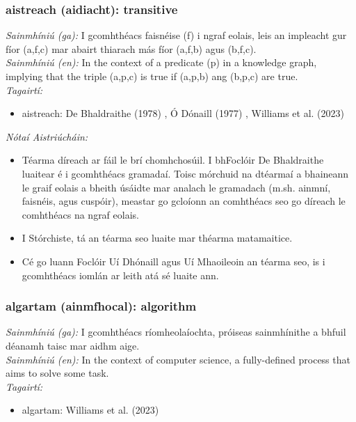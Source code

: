 \subsubsection*{aistreach (aidiacht): transitive}
 \noindent \textit{Sainmhíniú (ga):} I gcomhthéacs faisnéise (f) i ngraf eolais, leis an impleacht gur fíor (a,f,c) mar abairt thiarach más fíor (a,f,b) agus (b,f,c).
\\
 \noindent \textit{Sainmhíniú (en):} In the context of a predicate (p) in a knowledge graph, implying that the triple (a,p,c) is true if (a,p,b) ang (b,p,c) are true.
\\
 \noindent \textit{Tagairtí:}
\begin{itemize}
	\item aistreach: De Bhaldraithe (1978) \cite{de-bhaldraithe}, Ó Dónaill (1977) \cite{odonaill}, Williams et al. (2023) \cite{storchiste}
\end{itemize}

 \noindent \textit{Nótaí Aistriúcháin:}
\begin{itemize}
	\item Téarma díreach ar fáil le brí chomhchosúil. I bhFoclóir De Bhaldraithe luaitear é i gcomhthéacs gramadaí. Toisc mórchuid na dtéarmaí a bhaineann le graif eolais a bheith úsáidte mar analach le gramadach (m.sh. ainmní, faisnéis, agus cuspóir), meastar go gcloíonn an comhthéacs seo go díreach le comhthéacs na ngraf eolais.
	\item I Stórchiste, tá an téarma seo luaite mar théarma matamaitice.
	\item Cé go luann Foclóir Uí Dhónaill agus Uí Mhaoileoin an téarma seo, is i gcomhthéacs iomlán ar leith atá sé luaite ann.
\end{itemize}


\subsubsection*{algartam (ainmfhocal): algorithm}
 \noindent \textit{Sainmhíniú (ga):} I gcomhthéacs ríomheolaíochta, próiseas sainmhínithe a bhfuil déanamh taisc mar aidhm aige.
\\
 \noindent \textit{Sainmhíniú (en):} In the context of computer science, a fully-defined process that aims to solve some task.
\\
 \noindent \textit{Tagairtí:}
\begin{itemize}
	\item algartam: Williams et al. (2023) \cite{storchiste}
\end{itemize}

